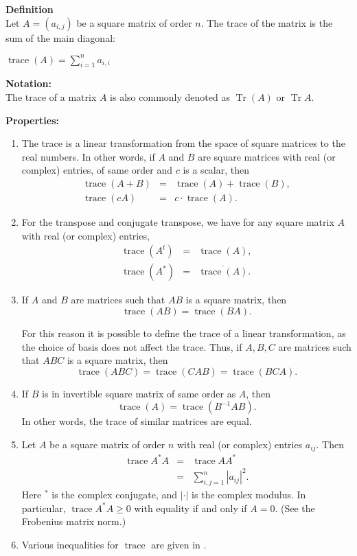 \documentclass[12pt]{article}
\begin{document}
\textbf{Definition} \\
Let $A=(a_{i,j})$ be a square matrix of
order $n$. 
The trace of the matrix is the sum of the main diagonal:
\begin{center} $\operatorname{trace}(A)= \sum\limits _{i=1} ^{n}
 a_{i,i}$
\end{center}

\textbf{Notation:}\\
The trace of a matrix $A$ is also commonly denoted as $\operatorname{Tr}(A)$ 
or $\operatorname{Tr}A$.
 
\textbf{Properties:}
 \begin{enumerate}
\item  The trace is a linear transformation from the space of square matrices to
 the real numbers. In other words, if $A$ and $B$ are square matrices with real (or complex) entries, 
of same order and $c$ is a scalar, then 
\begin{eqnarray*}
  \operatorname{trace}(A+B) &=& \operatorname{trace}(A)+ \operatorname{trace}(B), \\
  \operatorname{trace}(cA) &=& c\cdot \operatorname{trace}(A).
\end{eqnarray*}
\item For  the transpose and conjugate transpose, we have for any 
square matrix $A$ with real (or complex) entries, 
\begin{eqnarray*} 
\operatorname{trace} (A^t) &=& \operatorname{trace} (A), \\
\operatorname{trace} (A^\ast) &=& \overline{\operatorname{trace} (A)}.
\end{eqnarray*}
\item If $A$ and $B$ are matrices such that $AB$ is a square matrix, then 
$$ \operatorname{trace} (AB) = \operatorname{trace} (BA).$$

For this reason it is possible to define the trace of a linear transformation, as the choice of basis does not affect the trace.
Thus, if $A,B,C$ are matrices such that $ABC$ is a square matrix, then
$$ \operatorname{trace} (ABC) = \operatorname{trace} (CAB) = \operatorname{trace} (BCA).$$
\item If $B$ is in invertible square matrix of same order as $A$, then 
$$ \operatorname{trace} (A) = \operatorname{trace} (B^{-1}A B).$$
In other words, the trace of similar matrices are equal. 
\item Let $A$ be a square matrix of order $n$ with real (or complex)
entries $a_{ij}$. Then
\begin{eqnarray*}
\operatorname{trace} A^\ast A &=& \operatorname{trace} A A^\ast \\
                &=& \sum_{i,j=1}^n |a_{ij}|^2.
\end{eqnarray*}
Here $^\ast$ is the complex conjugate, and $|\cdot|$ is the complex modulus.
In particular, $\operatorname{trace} A^\ast A\ge 0$ with equality if and only if $A=0$.
(See the Frobenius matrix norm.)
\item Various inequalities for $\operatorname{trace}$ are given in 
\cite{yang}.
\end{enumerate}
 
\end{document}
